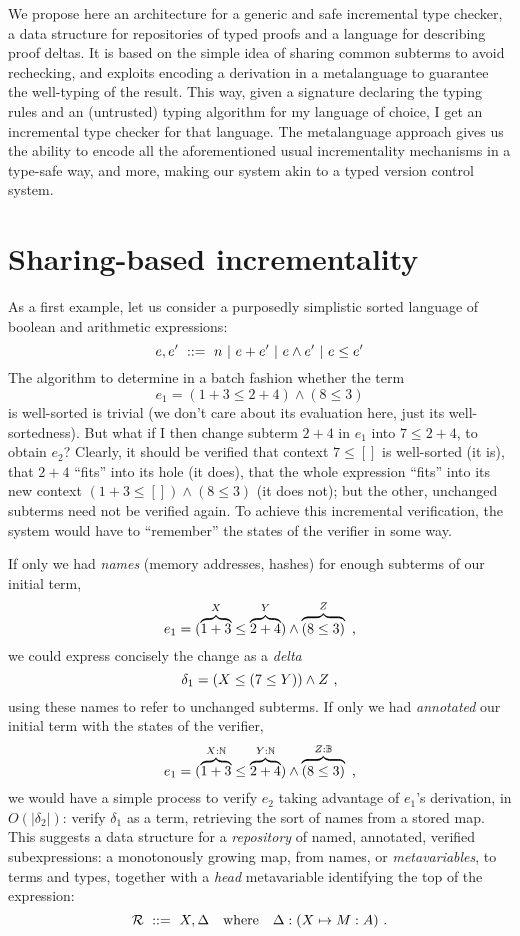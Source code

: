 \documentclass[9pt]{sigplanconf}
\begin{document}
We propose here an architecture for a generic and safe incremental
type checker, a data structure for repositories of typed proofs and a
language for describing proof deltas. It is based on the simple idea
of sharing common subterms to avoid rechecking, and exploits encoding
a derivation in a metalanguage to guarantee the well-typing of the
result. This way, given a signature declaring the typing rules and an
(untrusted) typing algorithm for my language of choice, I get an
incremental type checker for that language. The metalanguage approach
gives us the ability to encode all the aforementioned usual
incrementality mechanisms in a type-safe way, and more, making our
system akin to a typed version control system.

\section{Sharing-based incrementality}

As a first example, let us consider a purposedly simplistic sorted
language of boolean and arithmetic expressions:
$$ e, e' \ ::=\  n \ |\  e + e' \ |\  e \land e' \ |\  e \leq e' $$
The algorithm to determine in a batch fashion whether the term
$$ e_1 = (1 + 3 \leq 2 + 4) \land (8 \leq 3) $$ is well-sorted is
trivial (we don't care about its evaluation here, just its
well-sortedness). But what if I then change subterm $2+4$ in $e_1$
into $7 \leq 2+4$, to obtain $e_2$? Clearly, it should be verified
that context $7\leq []$ is well-sorted (it is), that $2+4$ ``fits''
into its hole (it does), that the whole expression ``fits'' into its
new context $(1+3\leq [])\land(8\leq 3)$ (it does not); but the other,
unchanged subterms need not be verified again. To achieve this
incremental verification, the system would have to ``remember'' the
states of the verifier in some way.

If only we had \emph{names} (memory addresses, hashes) for enough
subterms of our initial term, $$ e_1 = (\overbrace{1 + 3}^\mmeta \leq
\overbrace{2+4}^\mmmeta) \land \overbrace{(8 \leq 3)}^\mmmmeta\text{\
  ,} $$ we could express concisely the change as a
\emph{delta} $$\delta_1 = (\mmeta\leq(7\leq \mmmeta))\land \mmmmeta
\text{\ ,}$$ using these names to refer to unchanged subterms. If only
we had \emph{annotated} our initial term with the states of the
verifier,
$$e_1 = (\overbrace{1 + 3}^{\mmeta:\nat} \leq \overbrace{2 +
  4}^{\mmmeta:\nat}) \land \overbrace{(8 \leq
  3)}^{\mmmmeta:\bool}\text{\ ,} $$ we would have a simple process to
verify $e_2$ taking advantage of $e_1$'s derivation, in
$O(|\delta_2|)$: verify $\delta_1$ as a term, retrieving the sort of
names from a stored map. This suggests a data structure for a
\emph{repository} of named, annotated, verified subexpressions: a
monotonously growing map, from names, or \emph{metavariables}, to terms
and types, together with a \emph{head} metavariable identifying the
top of the expression: $$\mr \gequal X, \Delta \quad\text{where}\quad
\Delta : (\mmeta\mapsto M : A) \text{\ .}$$
\end{document}
